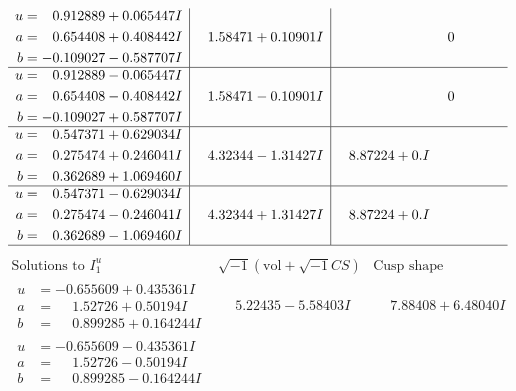 \documentclass[1p]{elsarticle_modified}
\theoremstyle{definition}
\newcommand{\I}{\sqrt{-1}}
\begin{document}
$$\begin{array}{c|c|c}
\begin{aligned}
u &= \phantom{-}0.912889 + 0.065447 I \\
a &= \phantom{-}0.654408 + 0.408442 I \\
b &= -0.109027 - 0.587707 I\end{aligned}
 & \phantom{-}1.58471 + 0.10901 I & \phantom{-0.000000 } 0 \\ \hline\begin{aligned}
u &= \phantom{-}0.912889 - 0.065447 I \\
a &= \phantom{-}0.654408 - 0.408442 I \\
b &= -0.109027 + 0.587707 I\end{aligned}
 & \phantom{-}1.58471 - 0.10901 I & \phantom{-0.000000 } 0 \\ \hline\begin{aligned}
u &= \phantom{-}0.547371 + 0.629034 I \\
a &= \phantom{-}0.275474 + 0.246041 I \\
b &= \phantom{-}0.362689 + 1.069460 I\end{aligned}
 & \phantom{-}4.32344 - 1.31427 I & \phantom{-}8.87224 + 0. I\phantom{ +0.000000I} \\ \hline\begin{aligned}
u &= \phantom{-}0.547371 - 0.629034 I \\
a &= \phantom{-}0.275474 - 0.246041 I \\
b &= \phantom{-}0.362689 - 1.069460 I\end{aligned}
 & \phantom{-}4.32344 + 1.31427 I & \phantom{-}8.87224 + 0. I\phantom{ +0.000000I}\\
 \hline 
 \end{array}$$\newpage$$\begin{array}{c|c|c}  
\text{Solutions to }I^u_{1}& \I (\text{vol} + \sqrt{-1}CS) & \text{Cusp shape}\\
 \hline 
\begin{aligned}
u &= -0.655609 + 0.435361 I \\
a &= \phantom{-}1.52726 + 0.50194 I \\
b &= \phantom{-}0.899285 + 0.164244 I\end{aligned}
 & \phantom{-}5.22435 - 5.58403 I & \phantom{-}7.88408 + 6.48040 I \\ \hline\begin{aligned}
u &= -0.655609 - 0.435361 I \\
a &= \phantom{-}1.52726 - 0.50194 I \\
b &= \phantom{-}0.899285 - 0.164244 I\end{aligned}

\end{array}$$
\end{document}
